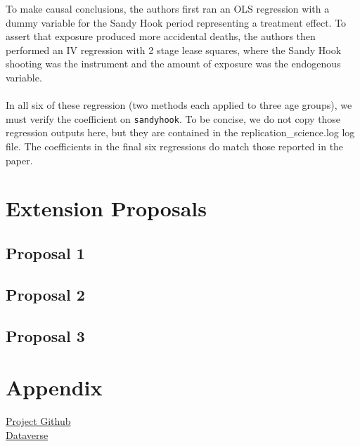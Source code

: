 \documentclass[12pt]{article}%
\begin{document}
To make causal conclusions, the authors first ran an OLS regression with a dummy variable for the Sandy Hook period representing a treatment effect. To assert that exposure produced more accidental deaths, the authors then performed an IV regression with 2 stage lease squares, where the Sandy Hook shooting was the instrument and the amount of exposure was the endogenous variable. \\ \\
In all six of these regression (two methods each applied to three age groups), we must verify the coefficient on \texttt{sandyhook}. To be concise, we do not copy those regression outputs here, but they are contained in the replication\_science.log log file. The coefficients in the final six regressions do match those reported in the paper. 
\section*{Extension Proposals} 
\subsection*{Proposal 1}
\subsection*{Proposal 2}
\subsection*{Proposal 3}


\section*{Appendix}
\href{https://github.com/dliu18/firearms-replication}{Project Github}\\
\href{https://dataverse.harvard.edu/dataset.xhtml?persistentId=doi:10.7910/DVN/EVLKBN}{Dataverse}
\end{document}
